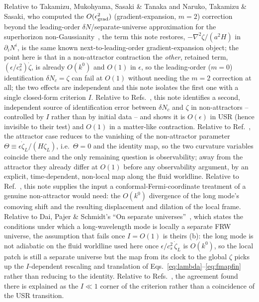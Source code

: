 \documentclass[aps,prd,twocolumn,superscriptaddress,showpacs,preprintnumbers,nofootinbib,longbibliography,floatfix]{revtex4-2}
\newcommand{\eps}{\epsilon}
\begin{document}
Relative to Takamizu, Mukohyama, Sasaki \& Tanaka and Naruko, Takamizu \& Sasaki, who
computed the $O(\eps_{\rm grad}^2)$ (gradient-expansion, $m=2$) correction beyond the leading-order
$\delta N$/separate-universe approximation for the superhorizon
non-Gaussianity~\cite{Takamizu2010,Naruko2012}, the term this note restores,
$-\nabla^2\zeta/(a^2H)$ in $\partial_iN^i$, is the same known next-to-leading-order
gradient-expansion object; the point here is that in a non-attractor contraction the
\emph{other}, retained term, $(\eps/c_s^2)\dot\zeta$, is already $O(k^0)$ and $O(1)$ in
$\eps$, so the leading-order ($m=0$) identification $\delta N_c=\zeta$ can fail at $O(1)$
without needing the $m=2$ correction at all; the two effects are independent and this note
isolates the first one with a single closed-form criterion $I$. Relative to
Refs.~\cite{Namjoo2013,Chen2013}, this note identifies a second, independent source of
identification error between $\delta N_c$ and $\zeta$ in non-attractors -- controlled by
$I$ rather than by initial data -- and shows it is $O(\eps)$ in USR (hence invisible to
their test) and $O(1)$ in a matter-like contraction. Relative to
Ref.~\cite{Pajer2013}, the attractor case reduces to the vanishing of the non-attractor
parameter $\Theta\equiv\eps\dot\zeta_L/(H\zeta_L)$, i.e.\ $\Theta=0$
and the identity map, so the two curvature variables coincide there and the only remaining
question is observability; away from the attractor they already differ at $O(1)$ before any
observability argument, by an explicit, time-dependent, non-local map along the fluid
worldline. Relative to Ref.~\cite{Dai2015}, this note supplies the input a conformal-Fermi-coordinate
treatment of a genuine non-attractor would need: the $O(k^0)$ divergence of the long
mode's comoving shift and the resulting displacement and dilation of the local frame.
Relative to Dai, Pajer \& Schmidt's ``On separate universes''~\cite{DaiSeparateUniverses2015},
which states the conditions under which a long-wavelength mode is locally a separate FRW
universe, the assumption that fails once $I=O(1)$ is theirs (b): the long mode is not
adiabatic on the fluid worldline used here once $\eps/c_s^2\,\dot\zeta_L$ is $O(k^0)$, so the
local patch is still a separate universe but the map from its clock to the global $\zeta$
picks up the $I$-dependent rescaling and translation of Eqs.~\eqref{eq:lambda}--\eqref{eq:fmapfin}
rather than reducing to the identity.
Relative to Refs.~\cite{Cai2018,Passaglia2019}, the agreement found there is explained as
the $I\ll1$ corner of the criterion rather than a coincidence of the USR transition.
\end{document}
